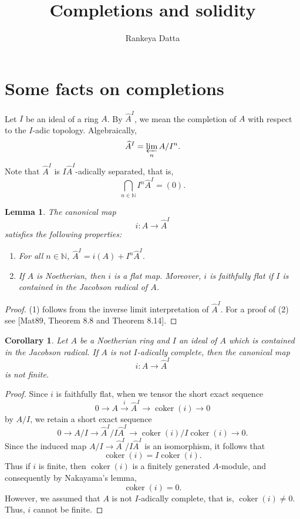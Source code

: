 \documentclass[11pt]{amsart}
\title{Completions and solidity}
\author{Rankeya Datta\vspace{-2ex}}
\DeclareMathOperator{\coker}{coker}
\theoremstyle{plain}
\newtheorem{lemma}[subsubsection]{Lemma}
\newtheorem{corollary}[subsubsection]{Corollary}
\theoremstyle{definition}
\theoremstyle{definition}
\theoremstyle{plain}
\theoremstyle{plain}
\numberwithin{equation}{subsubsection}
\numberwithin{equation}{subsubsection}
\begin{document}
\maketitle

\section{Some facts on completions}
Let $I$ be an ideal of a ring $A$. By $\widehat{A}^I$, we mean the completion of $A$ with respect to the $I$-adic topology. Algebraically, 
$$\widehat{A}^I = \varprojlim_{n} A/I^n.$$
Note that $\widehat{A}^I$ is $I\widehat{A}^I$-adically separated, that is,
$$\bigcap_{n \in \mathbb N} I^n\widehat{A}^I = (0).$$

\begin{lemma}
\label{completion-map-basic-properties}
The canonical map
$$i: A \rightarrow \widehat{A}^I$$
satisfies the following properties:
\begin{enumerate}
\item For all $n \in \mathbb{N}$, $\widehat{A}^I = i(A) + I^n\widehat{A}^I.$
\item If $A$ is Noetherian, then $i$ is a flat map. Moreover, $i$ is faithfully flat if $I$ is contained in the Jacobson radical of $A$.
\end{enumerate}
\end{lemma}

\begin{proof}
(1) follows from the inverse limit interpretation of $\widehat{A}^I$. For a proof of (2) see [Mat89, Theorem 8.8 and Theorem 8.14].
\end{proof}


\begin{corollary}
\label{completion-not-fg}
Let $A$ be a Noetherian ring and $I$ an ideal of $A$ which is contained in the Jacobson radical. If $A$ is not $I$-adically complete, then the canonical map
$$i: A \rightarrow \widehat{A}^I$$
is not finite.
\end{corollary}

\begin{proof}
Since $i$ is faithfully flat, when we tensor the short exact sequence
$$0 \rightarrow A \xrightarrow{i} \widehat{A}^I \rightarrow \coker(i) \rightarrow 0$$
by $A/I$, we retain a short exact sequence
$$0 \rightarrow A/I \rightarrow \widehat{A}^I/I\widehat{A}^I \rightarrow \coker(i)/I\coker(i) \rightarrow 0.$$
Since the induced map $A/I \rightarrow \widehat{A}^I/I\widehat{A}^I$ is an isomorphism, it follows that
$$\coker(i) = I\coker(i).$$
Thus if $i$ is finite, then $\coker(i)$ is a finitely generated $A$-module, and consequently by Nakayama's lemma,
$$\coker(i) = 0.$$
However, we assumed that $A$ is not $I$-adically complete, that is, $\coker(i) \neq 0$. Thus, $i$ cannot be finite.
\end{proof}
\end{document}
